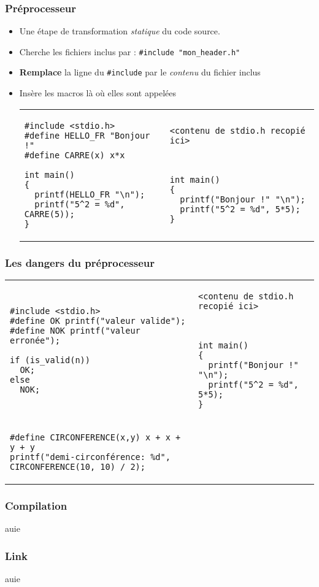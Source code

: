 \subsubsection{Préprocesseur}
\begin{frame}[fragile]
\begin{itemize}
  \item Une étape de transformation \textit{statique} du code source.
  \item Cherche les fichiers inclus par : \texttt{\#include "mon\_header.h"}
  \item \textbf{Remplace} la ligne du \texttt{\#include} par le \textit{contenu} du fichier inclus
  \item Insère les macros là où elles sont appelées
\begin{tabular}{p{5cm} p{5cm}}
\begin{lstlisting}
#include <stdio.h>
#define HELLO_FR "Bonjour !"
#define CARRE(x) x*x

int main()
{
  printf(HELLO_FR "\n");
  printf("5^2 = %d", CARRE(5));
}
\end{lstlisting} & 
\begin{lstlisting}
<contenu de stdio.h recopié ici>



int main()
{
  printf("Bonjour !" "\n");
  printf("5^2 = %d", 5*5);
}
\end{lstlisting}
\end{tabular}
\end{itemize}
\end{frame}

\subsubsection{Les dangers du préprocesseur}
\begin{frame}[fragile]
\begin{center}
\begin{tabular}{p{5.5cm} p{5.5cm}}
\begin{lstlisting}
#include <stdio.h>
#define OK printf("valeur valide");
#define NOK printf("valeur erronée");

if (is_valid(n))
  OK;
else
  NOK;
\end{lstlisting} & 
\begin{lstlisting}
<contenu de stdio.h recopié ici>



int main()
{
  printf("Bonjour !" "\n");
  printf("5^2 = %d", 5*5);
}
\end{lstlisting} \\
\begin{lstlisting}
#define CIRCONFERENCE(x,y) x + x + y + y
printf("demi-circonférence: %d", CIRCONFERENCE(10, 10) / 2);
\end{lstlisting}
\end{tabular}
\end{center}
\end{frame}
\subsubsection{Compilation}
\begin{frame} auie \end{frame}
\subsubsection{Link}
\begin{frame} auie \end{frame}
